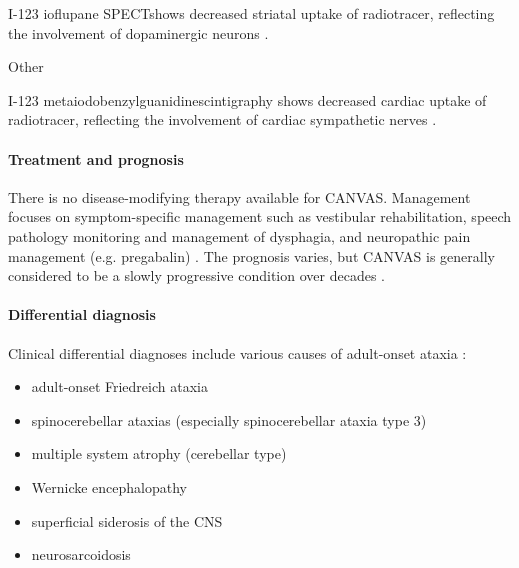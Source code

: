 I-123 ioflupane SPECTshows decreased striatal uptake of radiotracer, reflecting the involvement of dopaminergic neurons .

Other

I-123 metaiodobenzylguanidinescintigraphy shows decreased cardiac uptake of radiotracer, reflecting the involvement of cardiac sympathetic nerves .

\paragraph{Treatment and prognosis}

There is no disease-modifying therapy available for CANVAS. Management focuses on symptom-specific management such as vestibular rehabilitation, speech pathology monitoring and management of dysphagia, and neuropathic pain management (e.g. pregabalin) . The prognosis varies, but CANVAS is generally considered to be a slowly progressive condition over decades .

\paragraph{Differential diagnosis}

Clinical differential diagnoses include various causes of adult-onset ataxia :

\begin{itemize}
	\item
	adult-onset Friedreich ataxia
	\item
	spinocerebellar ataxias (especially spinocerebellar ataxia type 3)
	\item
	multiple system atrophy (cerebellar type)
	\item
	Wernicke encephalopathy
	\item
	superficial siderosis of the CNS
	\item
	neurosarcoidosis
\end{itemize}